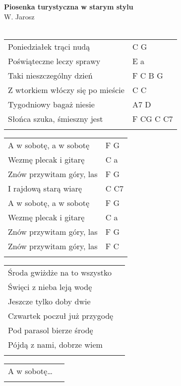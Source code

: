 \documentclass[a5paper]{article}
\begin{document}


\noindent
\fontsize{12pt}{15pt}\selectfont
\textbf{Piosenka turystyczna w starym stylu} \\
\fontsize{8pt}{10pt}\selectfont
W. Jarosz \\ \\
\fontsize{10pt}{12pt}\selectfont
{}
\begin{tabular}{@{}p{7.50cm}p{3cm}@{}}
\noindent
Poniedziałek trąci nudą & C G \\
Poświąteczne leczy sprawy & E a \\
Taki nieszczególny dzień & F C B G \\
Z wtorkiem włóczy się po mieście & C C \\
Tygodniowy bagaż niesie & A7 D \\
Słońca szuka, śmieszny jest & F CG C C7 \\ \\
\end{tabular}

\noindent
\begin{tabular}{@{}p{6.50cm}p{3cm}@{}} 
A w sobotę, a w sobotę & F G \\
Wezmę plecak i gitarę & C a \\
Znów przywitam góry, las & F G \\
I rajdową starą wiarę & C C7 \\
A w sobotę, a w sobotę & F G \\
Wezmę plecak i gitarę & C a \\
Znów przywitam góry, las & F G \\
Znów przywitam góry, las & F C \\ \\
\end{tabular}

\noindent
\begin{tabular}{@{}p{7.50cm}p{3cm}@{}}
Środa gwiżdże na to wszystko \\
Święci z nieba leją wodę \\
Jeszcze tylko doby dwie \\
Czwartek poczuł już przygodę \\
Pod parasol bierze środę \\
Pójdą z nami, dobrze wiem \\ \\
\end{tabular}

\noindent
\begin{tabular}{@{}p{7.50cm}p{3cm}@{}}
A w sobotę… \\ \\
\end{tabular}
\end{document}
